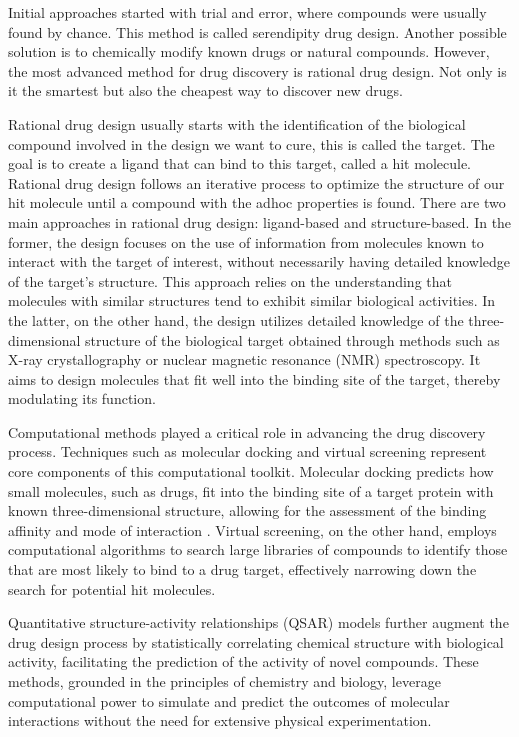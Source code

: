 Initial approaches started with trial and error, where compounds were usually found by chance. This method is called serendipity drug design. \cite{Ban2006Serendipity} Another possible solution is to chemically modify known drugs or natural compounds. \cite{Cheng2013Cyclosporin} However, the most advanced method for drug discovery is rational drug design. \cite{MANDAL200990} Not only is it the smartest but also the cheapest way to discover new drugs. 

Rational drug design usually starts with the identification of the biological compound involved in the design we want to cure, this is called the target. The goal is to create a ligand that can bind to this target, called a hit molecule. Rational drug design follows an iterative process to optimize the structure of our hit molecule until a compound with the adhoc properties is found. There are two main approaches in rational drug design: ligand-based and structure-based. In the former, the design focuses on the use of information from molecules known to interact with the target of interest, without necessarily having detailed knowledge of the target's structure. This approach relies on the understanding that molecules with similar structures tend to exhibit similar biological activities. In the latter, on the other hand, the design utilizes detailed knowledge of the three-dimensional structure of the biological target obtained through methods such as X-ray crystallography or nuclear magnetic resonance (NMR) spectroscopy. It aims to design molecules that fit well into the binding site of the target, thereby modulating its function. \cite{WilsonLill2011}

Computational methods played a critical role in advancing the drug discovery process. Techniques such as molecular docking and virtual screening represent core components of this computational toolkit. Molecular docking predicts how small molecules, such as drugs, fit into the binding site of a target protein with known three-dimensional structure, allowing for the assessment of the binding affinity and mode of interaction \cite{STANZIONE2021273}. Virtual screening, on the other hand, employs computational algorithms to search large libraries of compounds to identify those that are most likely to bind to a drug target, effectively narrowing down the search for potential hit molecules. \cite{virtualscreening}

Quantitative structure-activity relationships (QSAR) models further augment the drug design process by statistically correlating chemical structure with biological activity, facilitating the prediction of the activity of novel compounds. \cite{BELFIELD2023100251} These methods, grounded in the principles of chemistry and biology, leverage computational power to simulate and predict the outcomes of molecular interactions without the need for extensive physical experimentation.

